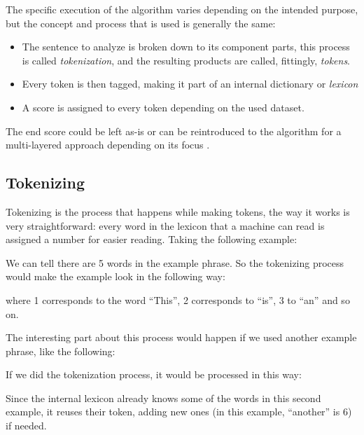 \documentclass[review]{elsarticle} %
\begin{document}
The specific execution of the algorithm varies depending on the intended purpose, but the concept and process that is used is generally the same:
\begin{itemize}
	\item The sentence to analyze is broken down to its component parts, this process is called \textit{tokenization}, and the resulting products are called, fittingly, \textit{tokens}.
	\item Every token is then tagged, making it part of an internal dictionary or \textit{lexicon}
	\item A score is assigned to every token depending on the used dataset.
\end{itemize}
The end score could be left as-is or can be reintroduced to the algorithm for a multi-layered approach depending on its focus \citep{rf4}.

\subsection{Tokenizing}
Tokenizing is the process that happens while making tokens, the way it works is very straightforward: every word in the lexicon that a machine can read is assigned a number for easier reading. Taking the following example:
\begin{center}
\end{center}

We can tell there are 5 words in the example phrase. So the tokenizing process would make the example look in the following way:
\begin{center}
\end{center}

\noindent where 1 corresponds to the word ``This'', 2 corresponds to ``is'', 3 to ``an'' and so on.

The interesting part about this process would happen if we used another example phrase, like the following:
\begin{center}
\end{center}

If we did the tokenization process, it would be processed in this way:
\begin{center}
\end{center}

Since the internal lexicon already knows some of the words in this second example, it reuses their token, adding new ones (in this example, ``another'' is 6) if needed.\\
\end{document}
